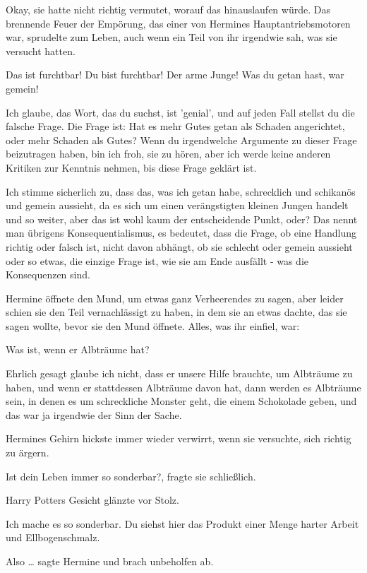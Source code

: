 Okay, sie hatte nicht richtig vermutet, worauf das hinauslaufen würde. Das
brennende Feuer der Empörung, das einer von Hermines Hauptantriebsmotoren war,
sprudelte zum Leben, auch wenn ein Teil von ihr irgendwie sah, was sie versucht
hatten.

\glqq Das ist furchtbar! Du bist furchtbar! Der arme Junge! Was du getan hast,
war gemein!\grqq{}

\glqq Ich glaube, das Wort, das du suchst, ist 'genial', und auf jeden Fall
stellst du die falsche Frage. Die Frage ist: Hat es mehr Gutes getan als Schaden
angerichtet, oder mehr Schaden als Gutes? Wenn du irgendwelche Argumente zu
dieser Frage beizutragen haben, bin ich froh, sie zu hören, aber ich werde keine
anderen Kritiken zur Kenntnis nehmen, bis diese Frage geklärt ist.

Ich stimme sicherlich zu, dass das, was ich getan habe, schrecklich und
schikanös und gemein aussieht, da es sich um einen verängstigten kleinen Jungen
handelt und so weiter, aber das ist wohl kaum der entscheidende Punkt, oder? Das
nennt man übrigens Konsequentialismus, es bedeutet, dass die Frage, ob eine
Handlung richtig oder falsch ist, nicht davon abhängt, ob sie schlecht oder
gemein aussieht oder so etwas, die einzige Frage ist, wie sie am Ende ausfällt -
was die Konsequenzen sind.\grqq{}

Hermine öffnete den Mund, um etwas ganz Verheerendes zu sagen, aber leider
schien sie den Teil vernachlässigt zu haben, in dem sie an etwas dachte, das sie
sagen wollte, bevor sie den Mund öffnete. Alles, was ihr einfiel, war:

\glqq Was ist, wenn er Albträume hat?\grqq{}

\glqq Ehrlich gesagt glaube ich nicht, dass er unsere Hilfe brauchte, um
Albträume zu haben, und wenn er stattdessen Albträume davon hat, dann werden es
Albträume sein, in denen es um schreckliche Monster geht, die einem Schokolade
geben, und das war ja irgendwie der Sinn der Sache.\grqq{}

Hermines Gehirn hickste immer wieder verwirrt, wenn sie versuchte, sich richtig
zu ärgern.

\glqq Ist dein Leben immer so sonderbar?\grqq{}, fragte sie schließlich.

Harry Potters Gesicht glänzte vor Stolz.

\glqq Ich mache es so sonderbar. Du siehst hier das Produkt einer Menge harter
Arbeit und Ellbogenschmalz.\grqq{}

\glqq Also …\grqq{} sagte Hermine und brach unbeholfen ab.

